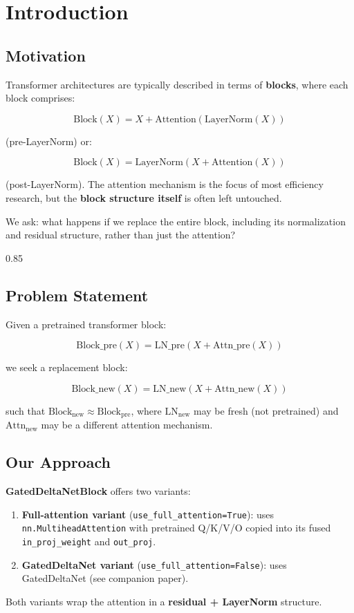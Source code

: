 
\section{Introduction}

\subsection{Motivation}

Transformer architectures are typically described in terms of \textbf{blocks}, 
where each block comprises:

\[
\text{Block}(X) = X + \text{Attention}(\text{LayerNorm}(X))
\tag{1.1}
\]

(pre-LayerNorm) or:

\[
\text{Block}(X) = \text{LayerNorm}(X + \text{Attention}(X))
\tag{1.2}
\]

(post-LayerNorm). The attention mechanism is the focus of most efficiency 
research, but the \textbf{block structure itself} is often left untouched.

We ask: what happens if we replace the entire block, including its 
normalization and residual structure, rather than just the attention?

0.85


\subsection{Problem Statement}

Given a pretrained transformer block:

\[
\text{Block}\_\text{pre}(X) = \text{LN}\_\text{pre}(X + \text{Attn}\_\text{pre}(X))
\tag{1.3}
\]

we seek a replacement block:

\[
\text{Block}\_\text{new}(X) = \text{LN}\_\text{new}(X + \text{Attn}\_\text{new}(X))
\tag{1.4}
\]

such that $\text{Block}_\text{new} \approx \text{Block}_\text{pre}$, where 
$\text{LN}_\text{new}$ may be fresh (not pretrained) and $\text{Attn}_\text{new}$ 
may be a different attention mechanism.

\subsection{Our Approach}

\textbf{GatedDeltaNetBlock} offers two variants:

\begin{enumerate}
\item \textbf{Full-attention variant} (\texttt{use\_full\_attention=True}): uses
  \texttt{nn.MultiheadAttention} with pretrained Q/K/V/O copied into its fused
  \texttt{in\_proj\_weight} and \texttt{out\_proj}.

\item \textbf{GatedDeltaNet variant} (\texttt{use\_full\_attention=False}): uses GatedDeltaNet
  (see companion paper).

\end{enumerate}
Both variants wrap the attention in a \textbf{residual + LayerNorm} structure.

